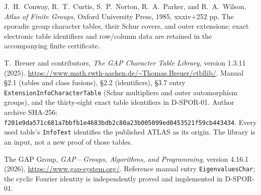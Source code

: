  J.~H.~Conway, R.~T.~Curtis, S.~P.~Norton,
R.~A.~Parker, and R.~A.~Wilson, \emph{Atlas of Finite Groups},
Oxford University Press, 1985, xxxiv+252 pp.
The sporadic group character tables, their Schur covers, and outer
extensions; exact electronic table identifiers and row/column data
are retained in the accompanying finite certificate.

 T.~Breuer and contributors,
\emph{The GAP Character Table Library}, version 1.3.11 (2025).
\url{https://www.math.rwth-aachen.de/~Thomas.Breuer/ctbllib/}.
Manual \S2.1 (tables and class fusions), \S2.2 (identifiers),
\S3.7 entry \texttt{ExtensionInfoCharacterTable} (Schur multipliers
and outer automorphism groups), and the thirty-eight exact table
identifiers in D-SPOR-01.  Author archive SHA-256:
\texttt{f201e9da571c681a7bbfb1e4683bdb2c80a23b005099ed0453521f59cb443434}.
Every used table's \texttt{InfoText} identifies the published ATLAS
as its origin.  The library is an input, not a new proof of those tables.

 The GAP Group,
\emph{GAP---Groups, Algorithms, and Programming}, version 4.16.1 (2026),
\url{https://www.gap-system.org/}.
Reference manual entry \texttt{EigenvaluesChar}; the cyclic Fourier
identity is independently proved and implemented in D-SPOR-01.
